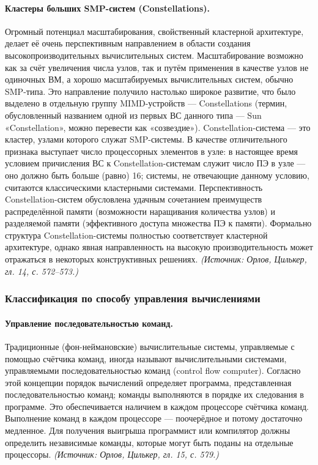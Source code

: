 \documentclass[a4paper,12pt]{article}
\begin{document}
\paragraph{Кластеры больших SMP-систем (Constellations).}
Огромный потенциал масштабирования, свойственный кластерной архитектуре, делает её очень перспективным направлением в области создания высокопроизводительных вычислительных систем. Масштабирование возможно как за счёт увеличения числа узлов, так и путём применения в качестве узлов не одиночных ВМ, а хорошо масштабируемых вычислительных систем, обычно SMP-типа. Это направление получило настолько широкое развитие, что было выделено в отдельную группу MIMD-устройств — Constellations (термин, обусловленный названием одной из первых ВС данного типа — Sun «Constellation», можно перевести как «созвездие»). Constellation-система — это кластер, узлами которого служат SMP-системы. В качестве отличительного признака выступает число процессорных элементов в узле: в настоящее время условием причисления ВС к Constellation-системам служит число ПЭ в узле — оно должно быть больше (равно) 16; системы, не отвечающие данному условию, считаются классическими кластерными системами. Перспективность Constellation-систем обусловлена удачным сочетанием преимуществ распределённой памяти (возможности наращивания количества узлов) и разделяемой памяти (эффективного доступа множества ПЭ к памяти). Формально структура Constellation-системы полностью соответствует кластерной архитектуре, однако явная направленность на высокую производительность может отражаться в некоторых конструктивных решениях.
\textit{(Источник: Орлов, Цилькер, гл. 14, с. 572--573.)}

\subsubsection{Классификация по способу управления вычислениями}

\paragraph{Управление последовательностью команд.}
Традиционные (фон-неймановские) вычислительные системы, управляемые с помощью счётчика команд, иногда называют вычислительными системами, управляемыми последовательностью команд (control flow computer). Согласно этой концепции порядок вычислений определяет программа, представленная последовательностью команд; команды выполняются в порядке их следования в программе. Это обеспечивается наличием в каждом процессоре счётчика команд. Выполнение команд в каждом процессоре — поочерёдное и потому достаточно медленное. Для получения выигрыша программист или компилятор должны определить независимые команды, которые могут быть поданы на отдельные процессоры.
\textit{(Источник: Орлов, Цилькер, гл. 15, с. 579.)}
\end{document}
